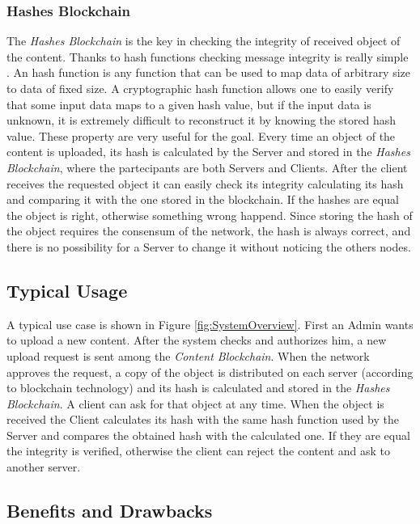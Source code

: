 \documentclass[conference,compsoc]{IEEEtran}
\begin{document}
\subsubsection{Hashes Blockchain}
The \textit{Hashes Blockchain} is the key in checking the integrity of received object of the content. Thanks to hash functions checking message integrity is really simple \cite{tsudik1992message}. An hash function is any function that can be used to map data of arbitrary size to data of fixed size. A cryptographic hash function allows one to easily verify that some input data maps to a given hash value, but if the input data is unknown, it is extremely difficult to reconstruct it by knowing the stored hash value. These property are very useful for the goal. Every time an object of the content is uploaded, its hash is calculated by the Server and stored in the \textit{Hashes Blockchain}, where the partecipants are both Servers and Clients. After the client receives the requested object it can easily check its integrity calculating its hash and comparing it with the one stored in the blockchain. If the hashes are equal the object is right, otherwise something wrong happend. Since storing the hash of the object requires the consensum of the network, the hash is always correct, and there is no possibility for a Server to change it without noticing the others nodes. 
	
\subsection{Typical Usage}
A typical use case is shown in Figure \ref{fig:SystemOverview}. First an Admin wants to upload a new content. After the system checks and authorizes him, a new upload request is sent among the \textit{Content Blockchain}. When the network approves the request, a copy of the object is distributed on each server (according to blockchain technology) and its hash is calculated and stored in the \textit{Hashes Blockchain}. A client can ask for that object at any time. When the object is received the Client calculates its hash with the same hash function used by the Server and compares the obtained hash with the calculated one. If they are equal the integrity is verified, otherwise the client can reject the content and ask to another server.

\subsection{Benefits and Drawbacks}
\end{document}
